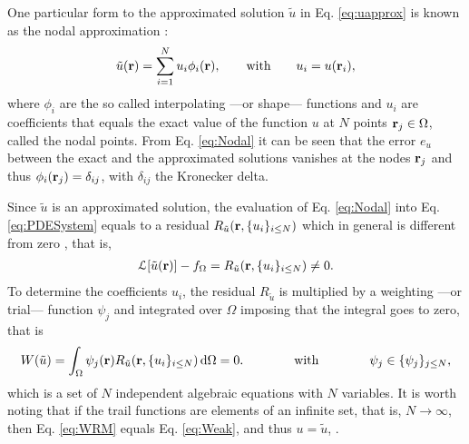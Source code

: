      One particular form to the approximated solution $\tilde{u}$ in Eq. \eqref{eq:uapprox} is known as the nodal approximation \cite{dhatt_finite_2012, fletcher_computational_1984}:
     \begin{align}
        \tilde{u}(\vb{r}) = \sum_{i = 1}^N u_i \phi_i(\vb{r}),
            \qquad
            \text{with}
            \qquad
        u_i = u(\vb{r}_i),
     \label{eq:Nodal}
     \end{align}
     where  $\phi_i$ are the so called interpolating ---or shape--- functions and $u_i$ are coefficients that equals the exact value of the function $u$ at $N$ points $\vb{r}_j \in \Omega$, called the nodal points. From Eq. \eqref{eq:Nodal} it can be seen that the error $e_{u}$ between the exact and the approximated solutions vanishes at the nodes $\vb{r}_j$ and thus $\phi_i(\vb{r}_j) = \delta_{ij}$, with $\delta_{ij}$ the Kronecker delta.

      Since $\tilde{u}$ is an approximated solution, the evaluation of Eq. \eqref{eq:Nodal} into Eq. \eqref{eq:PDESystem} equals to a residual $  R_{\tilde{u}}(\vb{r},\{u_i\}_{i\leq N}) $ which in general is different from zero \cite{fletcher_computational_1984,larson_finite_2013}, that is,
     \begin{align}
         \mathcal{L}[\tilde{u}(\vb{r})] - {f}_\Omega = R_{\tilde{u}}(\vb{r},\{u_i\}_{i\leq N}) \neq 0.
     \label{eq:PDESystem-app}
     \end{align}
     To determine the coefficients $u_i$, the residual $R_{\tilde{u}}$ is multiplied by a weighting ---or trial--- function $\psi_j$ and integrated over $\Omega$ imposing that the integral goes to zero, that is
     \begin{align}
        W(\tilde{u}) = \int_\Omega \psi_j(\vb{r}) R_{\tilde{u}}(\vb{r},\{u_i\}_{i\leq N}) \dd{\Omega} = 0.
            \qquad\qquad
            \text{with}
            \qquad\qquad
        \psi_j \in \{\psi_j\}_{j\leq N},
     \label{eq:WRM}
     \end{align}
     which is a set of $N$ independent algebraic equations with $N$ variables.  It is worth noting that if the trail functions are elements of an infinite set, that is, $N \to \infty$, then Eq. \eqref{eq:WRM} equals Eq. \eqref{eq:Weak}, and thus $u = \tilde{u}$, \cite{dhatt_finite_2012}.

